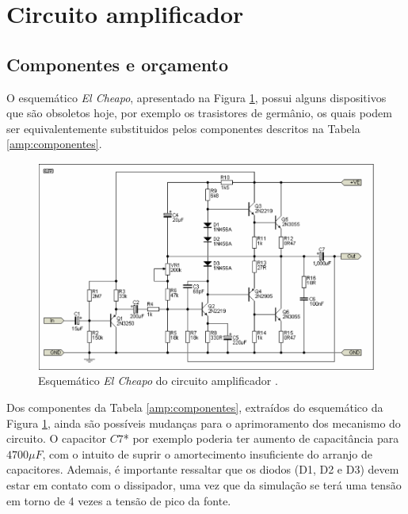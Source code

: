 \documentclass[a4paper,12pt,oneside,openany,table,xcdraw]{article}
\begin{document}
\newpage
\section{Circuito amplificador} \label{amp}
\subsection{Componentes e orçamento} 
O esquemático \emph{El Cheapo}, apresentado na Figura \ref{amp:esquematico}, possui alguns dispositivos que são obsoletos hoje, por exemplo os trasistores de germânio, os quais podem ser equivalentemente substituidos pelos componentes descritos na Tabela \ref{amp:componentes}. 
\vspace{0.2cm}

\begin{figure}[H]
\centering
\includegraphics[width=15cm]{amp-esquematico}
\caption{Esquemático \emph{El Cheapo} do circuito amplificador \cite{cheapo}.}
\label{amp:esquematico}
\end{figure}

\vspace{0.4cm}
Dos componentes da Tabela \ref{amp:componentes}, extraídos do esquemático da Figura \ref{amp:esquematico}, ainda são possíveis mudanças para o aprimoramento dos mecanismo do circuito. O capacitor $C7$* por exemplo poderia ter aumento de capacitância para $4700 \mu F$, com o intuito de suprir o amortecimento insuficiente do arranjo de capacitores. %
Ademais, é importante ressaltar que os diodos (D1, D2 e D3) devem estar em contato com o dissipador, uma vez que da simulação se terá uma tensão em torno de 4 vezes a tensão de pico da fonte. %
\end{document}
